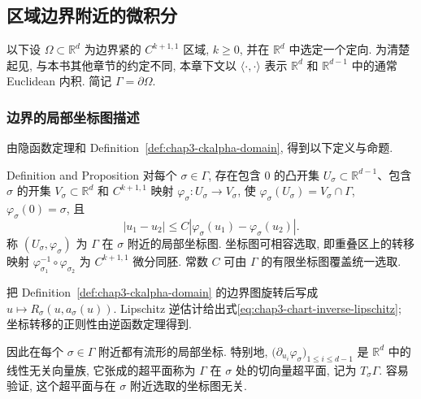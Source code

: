 \renewcommand{\thestatement}{3.\number\numexpr\value{statement}-54\relax}
\renewcommand{\thechapterthreesectionthreeremark}{3.\arabic{chapterthreesectionthreeremark}}

\subsection{区域边界附近的微积分}
\label{sec:chap3-boundary-calculus}

以下设 $\Omega\subset\mathbb R^d$ 为边界紧的 $C^{k+1,1}$ 区域, $k\geq0$, 并在 $\mathbb R^d$ 中选定一个定向. 为清楚起见, 与本书其他章节的约定不同, 本章下文以 $\langle\cdot,\cdot\rangle$ 表示 $\mathbb R^d$ 和 $\mathbb R^{d-1}$ 中的通常 Euclidean 内积. 简记 $\Gamma=\partial\Omega$.

\subsubsection{边界的局部坐标图描述}
\label{subsec:chap3-boundary-local-charts}

由隐函数定理和 Definition~\ref{def:chap3-ckalpha-domain}, 得到以下定义与命题.

\begin{Proposition}{Definition and Proposition}
\label{prop:chap3-boundary-local-chart}
对每个 $\sigma\in\Gamma$, 存在包含 $0$ 的凸开集 $U_\sigma\subset\mathbb R^{d-1}$、包含 $\sigma$ 的开集 $V_\sigma\subset\mathbb R^d$ 和 $C^{k+1,1}$ 映射 $\varphi_\sigma:U_\sigma\to V_\sigma$, 使 $\varphi_\sigma(U_\sigma)=V_\sigma\cap\Gamma$, $\varphi_\sigma(0)=\sigma$, 且
\begin{equation}
 |u_1-u_2|\leq C|\varphi_\sigma(u_1)-\varphi_\sigma(u_2)|.
 \label{eq:chap3-chart-inverse-lipschitz}
\end{equation}
称 $(U_\sigma,\varphi_\sigma)$ 为 $\Gamma$ 在 $\sigma$ 附近的局部坐标图. 坐标图可相容选取, 即重叠区上的转移映射 $\varphi_{\sigma_1}^{-1}\circ\varphi_{\sigma_2}$ 为 $C^{k+1,1}$ 微分同胚. 常数 $C$ 可由 $\Gamma$ 的有限坐标图覆盖统一选取.
\end{Proposition}

\begin{Proof}
把 Definition~\ref{def:chap3-ckalpha-domain} 的边界图旋转后写成 $u\mapsto R_\sigma(u,a_\sigma(u))$. Lipschitz 逆估计给出式\eqref{eq:chap3-chart-inverse-lipschitz}; 坐标转移的正则性由逆函数定理得到.
\end{Proof}

因此在每个 $\sigma\in\Gamma$ 附近都有流形的局部坐标. 特别地, $\bigl(\partial_{u_i}\varphi_\sigma\bigr)_{1\leq i\leq d-1}$ 是 $\mathbb R^d$ 中的线性无关向量族, 它张成的超平面称为 $\Gamma$ 在 $\sigma$ 处的切向量超平面, 记为 $T_\sigma\Gamma$. 容易验证, 这个超平面与在 $\sigma$ 附近选取的坐标图无关.

